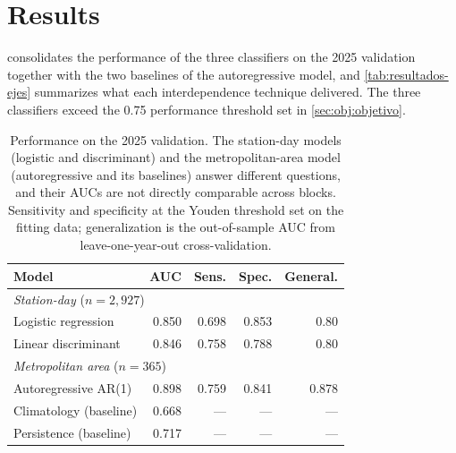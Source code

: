 \section{Results}
\label{sec:resultados}

 consolidates the performance of the three classifiers
on the 2025 validation together with the two baselines of the autoregressive
model, and \cref{tab:resultados-ejes} summarizes what each interdependence
technique delivered. The three classifiers exceed the 0.75 performance
threshold set in \cref{sec:obj:objetivo}.

\begin{table}[pos=t]
  \centering
  \caption{Performance on the 2025 validation. The station-day models
    (logistic and discriminant) and the metropolitan-area model
    (autoregressive and its baselines) answer different questions, and their
    AUCs are not directly comparable across blocks. Sensitivity and
    specificity at the Youden threshold set on the fitting data;
    generalization is the out-of-sample AUC from leave-one-year-out
    cross-validation.}
  \label{tab:resultados}
  \small
  \begin{tabular}{lrrrr}
    \toprule
    Model & AUC & Sens. & Spec. & General. \\
    \midrule
    \multicolumn{5}{l}{\emph{Station-day} ($n=2{,}927$)} \\
    Logistic regression    & 0.850 & 0.698 & 0.853 & 0.80 \\
    Linear discriminant    & 0.846 & 0.758 & 0.788 & 0.80 \\
    \midrule
    \multicolumn{5}{l}{\emph{Metropolitan area} ($n=365$)} \\
    Autoregressive AR(1)   & 0.898 & 0.759 & 0.841 & 0.878 \\
    Climatology (baseline) & 0.668 & ---   & ---   & --- \\
    Persistence (baseline) & 0.717 & ---   & ---   & --- \\
    \bottomrule
  \end{tabular}
\end{table}

